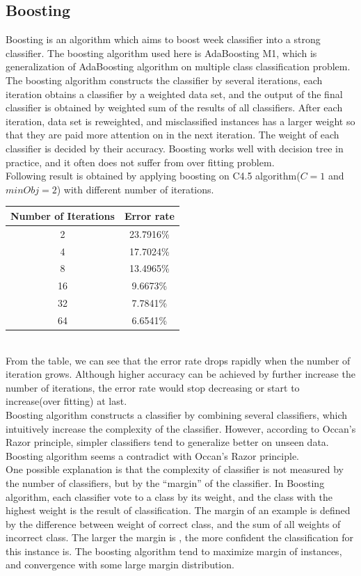\documentclass[a4paper,11pt]{article}
\begin{document}
\subsection{Boosting}
Boosting is an algorithm which aims to boost week classifier into a strong classifier. The boosting algorithm used here is AdaBoosting M1, which is
generalization of AdaBoosting algorithm on multiple class classification problem.\\
The boosting algorithm constructs the classifier by several iterations, each iteration obtains a classifier by a weighted data set, and the output of the final classifier is obtained by weighted sum of the results of all classifiers. After each iteration, data set is reweighted, and misclassified instances has a larger weight so that they are paid more attention on in the next iteration. The weight of each classifier is decided by their accuracy. Boosting works well with decision tree in practice, and it often does not suffer from over fitting problem.\\
Following result is obtained by applying boosting on C4.5 algorithm($C=1$ and $minObj=2$) with different number of iterations.\\
\vspace{0.5cm}
\begin{tabular}{c c}
Number of Iterations	& Error rate\\
\hline \hline
	2		& 23.7916\%\\
	4		& 17.7024\%\\
	8		& 13.4965\%\\
	16		& 9.6673\%\\
    32      & 7.7841\%\\
    64      & 6.6541\%\\
\end{tabular}
\vspace{0.5cm}\\
From the table, we can see that the error rate drops rapidly when the number of iteration grows. Although higher accuracy can be achieved by further increase the number of iterations, the error rate would stop decreasing or start to increase(over fitting) at last.\\
Boosting algorithm constructs a classifier by combining several classifiers, which intuitively increase the complexity of the classifier. However, according to Occan's Razor principle, simpler classifiers tend to generalize better on unseen data. Boosting algorithm seems a contradict with Occan's Razor principle.\\
One possible explanation is that the complexity of classifier is not measured by the number of classifiers, but by the ``margin'' of the classifier.
In Boosting algorithm, each classifier vote to a class by its weight, and the class with the highest weight is the result of classification. The margin of an example is defined by the difference between weight of correct class, and the sum of all weights of incorrect class. The larger the margin is , the more confident the classification for this instance is. The boosting algorithm tend to maximize margin of instances, and convergence with some large margin distribution\cite{boosting}.
\end{document}
